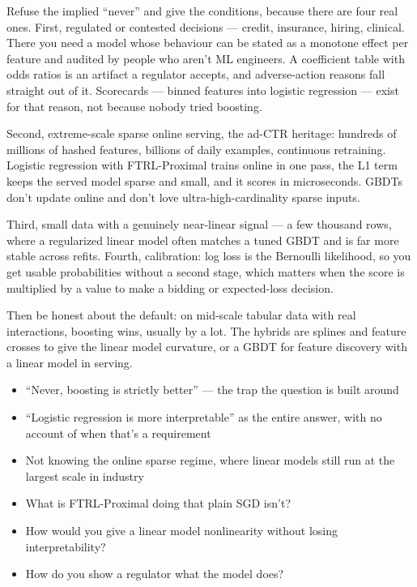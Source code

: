 \documentclass[10pt,twoside]{book}
\newcommand{\lab}[1]{\par\vspace{5pt}\noindent{\sffamily\footnotesize\bfseries\color{accent}#1}\par\vspace{1pt}}
\newcommand{\flab}[1]{\par\vspace{5pt}\noindent{\sffamily\footnotesize\bfseries\color{flag}#1}\par\vspace{1pt}}
\begin{document}
\lab{Say this}
Refuse the implied ``never'' and give the conditions, because there are four real ones. First, regulated or contested decisions --- credit, insurance, hiring, clinical. There you need a model whose behaviour can be stated as a monotone effect per feature and audited by people who aren't ML engineers. A coefficient table with odds ratios is an artifact a regulator accepts, and adverse-action reasons fall straight out of it. Scorecards --- binned features into logistic regression --- exist for that reason, not because nobody tried boosting.\par\vspace{3pt}
Second, extreme-scale sparse online serving, the ad-CTR heritage: hundreds of millions of hashed features, billions of daily examples, continuous retraining. Logistic regression with FTRL-Proximal trains online in one pass, the L1 term keeps the served model sparse and small, and it scores in microseconds. GBDTs don't update online and don't love ultra-high-cardinality sparse inputs.\par\vspace{3pt}
Third, small data with a genuinely near-linear signal --- a few thousand rows, where a regularized linear model often matches a tuned GBDT and is far more stable across refits. Fourth, calibration: log loss is the Bernoulli likelihood, so you get usable probabilities without a second stage, which matters when the score is multiplied by a value to make a bidding or expected-loss decision.\par\vspace{3pt}
Then be honest about the default: on mid-scale tabular data with real interactions, boosting wins, usually by a lot. The hybrids are splines and feature crosses to give the linear model curvature, or a GBDT for feature discovery with a linear model in serving.\par\vspace{3pt}
\flab{Loses the signal}
\begin{itemize}
\item ``Never, boosting is strictly better'' --- the trap the question is built around
\item ``Logistic regression is more interpretable'' as the entire answer, with no account of when that's a requirement
\item Not knowing the online sparse regime, where linear models still run at the largest scale in industry
\end{itemize}
\lab{Then they ask}
\begin{itemize}
\item What is FTRL-Proximal doing that plain SGD isn't?
\item How would you give a linear model nonlinearity without losing interpretability?
\item How do you show a regulator what the model does?
\end{itemize}
\end{document}

